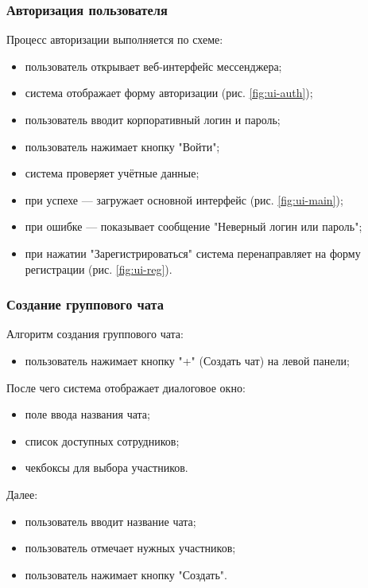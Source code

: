 \subsubsection{Авторизация пользователя}  
Процесс авторизации выполняется по схеме:  
\begin{itemize}  
	\item пользователь открывает веб-интерфейс мессенджера;  
	\item система отображает форму авторизации (рис. \ref{fig:ui-auth});  
	\item пользователь вводит корпоративный логин и пароль;  
	\item пользователь нажимает кнопку "Войти";  
	\item система проверяет учётные данные;
		\item при успехе — загружает основной интерфейс (рис. \ref{fig:ui-main});  
		\item при ошибке — показывает сообщение "Неверный логин или пароль";   
	\item при нажатии "Зарегистрироваться" система перенаправляет на форму регистрации (рис. \ref{fig:ui-reg}).  
\end{itemize}  

\subsubsection{Создание группового чата}  
Алгоритм создания группового чата:  
\begin{itemize}  
	\item пользователь нажимает кнопку "+" (Создать чат) на левой панели;
\end{itemize}

После чего система отображает диалоговое окно: 

\begin{itemize}
	\item поле ввода названия чата;  
	\item список доступных сотрудников;  
	\item чекбоксы для выбора участников.
\end{itemize}

Далее:

\begin{itemize}		
	\item пользователь вводит название чата;  
	\item пользователь отмечает нужных участников;  
	\item пользователь нажимает кнопку "Создать".
\end{itemize}

